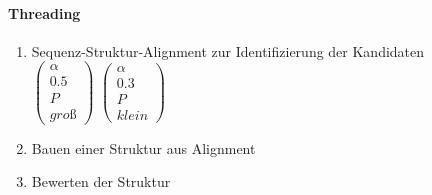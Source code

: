 \paragraph{Threading}
\begin{enumerate}
  \item Sequenz-Struktur-Alignment zur Identifizierung der Kandidaten\\
  $\left(\begin{array}{c} \alpha \\ 0.5 \\ P \\ groß \end{array}\right)$
  $\left(\begin{array}{c} \alpha \\ 0.3 \\ P \\ klein \end{array}\right)$
  \item Bauen einer Struktur aus Alignment
  \item Bewerten der Struktur
\end{enumerate}
